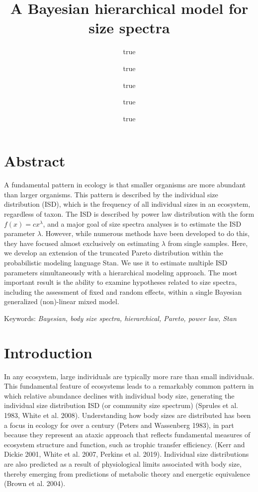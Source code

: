\documentclass[
  12pt,
]{article}
\title{A Bayesian hierarchical model for size spectra}
\author{true \and true \and true \and true \and true}
\date{}
\numberwithin{equation}
\begin{document}
\maketitle

\newpage

\hypertarget{abstract}{%
\section{Abstract}\label{abstract}}

A fundamental pattern in ecology is that smaller organisms are more
abundant than larger organisms. This pattern is described by the
individual size distribution (ISD), which is the frequency of all
individual sizes in an ecosystem, regardless of taxon. The ISD is
described by power law distribution with the form
\(f(x) = cx^{\lambda}\), and a major goal of size spectra analyses is to
estimate the ISD parameter \(\lambda\). However, while numerous methods
have been developed to do this, they have focused almost exclusively on
estimating \(\lambda\) from single samples. Here, we develop an
extension of the truncated Pareto distribution within the probabilistic
modeling language Stan. We use it to estimate multiple ISD parameters
simultaneously with a hierarchical modeling approach. The most important
result is the ability to examine hypotheses related to size spectra,
including the assessment of fixed and random effects, within a single
Bayesian generalized (non)-linear mixed model.

Keywords: \emph{Bayesian, body size spectra, hierarchical, Pareto, power
law, Stan}

\newpage

\hypertarget{introduction}{%
\section{Introduction}\label{introduction}}

In any ecosystem, large individuals are typically more rare than small
individuals. This fundamental feature of ecosystems leads to a
remarkably common pattern in which relative abundance declines with
individual body size, generating the individual size distribution ISD
(or community size spectrum) (Sprules et al. 1983, White et al. 2008).
Understanding how body sizes are distributed has been a focus in ecology
for over a century (Peters and Wassenberg 1983), in part because they
represent an ataxic approach that reflects fundamental measures of
ecosystem structure and function, such as trophic transfer efficiency.
(Kerr and Dickie 2001, White et al. 2007, Perkins et al. 2019).
Individual size distributions are also predicted as a result of
physiological limits associated with body size, thereby emerging from
predictions of metabolic theory and energetic equivalence (Brown et al.
2004).
\end{document}
